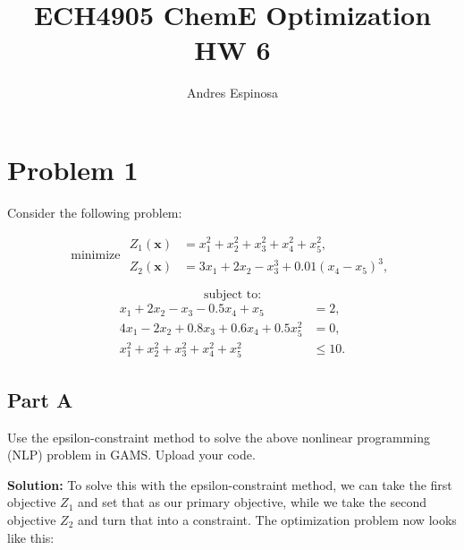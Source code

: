\documentclass[11pt]{article}
\title{ECH4905 ChemE Optimization HW 6}
\author{Andres Espinosa}
\begin{document}
\maketitle

\section{Problem 1}
Consider the following problem:

\[
\text{minimize } 
\begin{aligned}
    Z_1(\mathbf{x}) &= x_1^2 + x_2^2 + x_3^2 + x_4^2 + x_5^2, \\
    Z_2(\mathbf{x}) &= 3x_1 + 2x_2 - x_3^3 + 0.01(x_4 - x_5)^3,
\end{aligned}
\]

\[
\text{subject to:}
\]
\[
\begin{aligned}
    x_1 + 2x_2 - x_3 - 0.5x_4 + x_5 &= 2, \\
    4x_1 - 2x_2 + 0.8x_3 + 0.6x_4 + 0.5x_5^2 &= 0, \\
    x_1^2 + x_2^2 + x_3^2 + x_4^2 + x_5^2 &\leq 10.
\end{aligned}
\]

\subsection{Part A}
Use the epsilon-constraint method to solve the above nonlinear programming (NLP) problem in GAMS. Upload your code.

\textbf{Solution:}
To solve this with the epsilon-constraint method, we can take the first objective $Z_1$ and set that as our primary objective, while we take the second objective $Z_2$ and turn that into a constraint.
The optimization problem now looks like this:
\end{document}
